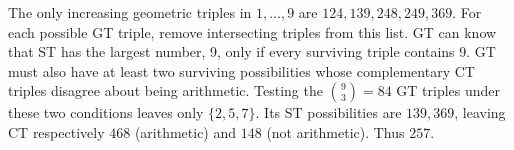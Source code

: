 The only increasing geometric triples in $1,\ldots,9$ are $124,139,248,249,369$. For each possible GT triple, remove intersecting triples from this list. GT can know that ST has the largest number, 9, only if every surviving triple contains 9. GT must also have at least two surviving possibilities whose complementary CT triples disagree about being arithmetic. Testing the $\binom93=84$ GT triples under these two conditions leaves only $\{2,5,7\}$. Its ST possibilities are $139,369$, leaving CT respectively $468$ (arithmetic) and $148$ (not arithmetic). Thus $\boxed{257}$.
